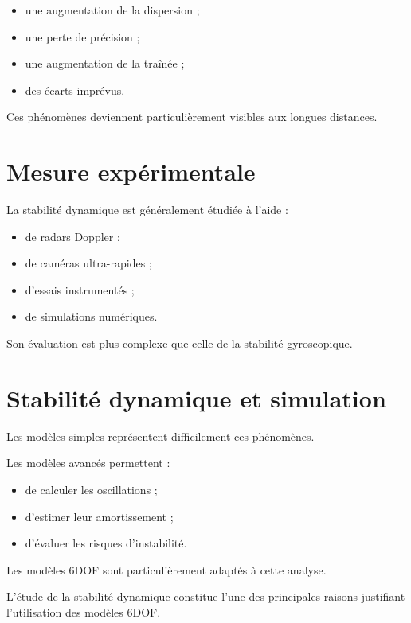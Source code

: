 \begin{itemize}
    \item une augmentation de la dispersion ;
    \item une perte de précision ;
    \item une augmentation de la traînée ;
    \item des écarts imprévus.
\end{itemize}

Ces phénomènes deviennent particulièrement visibles aux longues distances.

\section{Mesure expérimentale}

La stabilité dynamique est généralement étudiée à l'aide :

\begin{itemize}
    \item de radars Doppler ;
    \item de caméras ultra-rapides ;
    \item d'essais instrumentés ;
    \item de simulations numériques.
\end{itemize}

Son évaluation est plus complexe que celle de la stabilité gyroscopique.

\section{Stabilité dynamique et simulation}

Les modèles simples représentent difficilement ces phénomènes.

Les modèles avancés permettent :

\begin{itemize}
    \item de calculer les oscillations ;
    \item d'estimer leur amortissement ;
    \item d'évaluer les risques d'instabilité.
\end{itemize}

Les modèles 6DOF sont particulièrement adaptés à cette analyse.

\begin{simulation}

L'étude de la stabilité dynamique constitue l'une des principales raisons
justifiant l'utilisation des modèles 6DOF.

\end{simulation}

